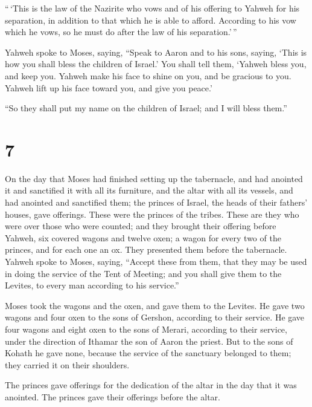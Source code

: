  ``\,`This is the law of the Nazirite who vows and of his
offering to Yahweh for his separation, in addition to that which he is
able to afford. According to his vow which he vows, so he must do after
the law of his separation.'\,''

 Yahweh spoke to Moses, saying,  ``Speak to
Aaron and to his sons, saying, `This is how you shall bless the children
of Israel.' You shall tell them,  `Yahweh bless you, and
keep you.  Yahweh make his face to shine on you, and be
gracious to you.  Yahweh lift up his face toward you, and
give you peace.'

 ``So they shall put my name on the children of Israel; and
I will bless them.''

\hypertarget{section-6}{%
\section{7}\label{section-6}}

 On the day that Moses had finished setting up the
tabernacle, and had anointed it and sanctified it with all its
furniture, and the altar with all its vessels, and had anointed and
sanctified them;  the princes of Israel, the heads of their
fathers' houses, gave offerings. These were the princes of the tribes.
These are they who were over those who were counted;  and
they brought their offering before Yahweh, six covered wagons and twelve
oxen; a wagon for every two of the princes, and for each one an ox. They
presented them before the tabernacle.  Yahweh spoke to
Moses, saying,  ``Accept these from them, that they may be
used in doing the service of the Tent of Meeting; and you shall give
them to the Levites, to every man according to his service.''

 Moses took the wagons and the oxen, and gave them to the
Levites.  He gave two wagons and four oxen to the sons of
Gershon, according to their service.  He gave four wagons
and eight oxen to the sons of Merari, according to their service, under
the direction of Ithamar the son of Aaron the priest.  But
to the sons of Kohath he gave none, because the service of the sanctuary
belonged to them; they carried it on their shoulders.

 The princes gave offerings for the dedication of the altar
in the day that it was anointed. The princes gave their offerings before
the altar.

